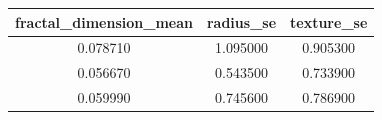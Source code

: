 \begin{tabular}{ccc}
\toprule
fractal\_dimension\_mean & radius\_se & texture\_se \\
\midrule
0.078710 & 1.095000 & 0.905300 \\
0.056670 & 0.543500 & 0.733900 \\
0.059990 & 0.745600 & 0.786900 \\
\bottomrule
\end{tabular}